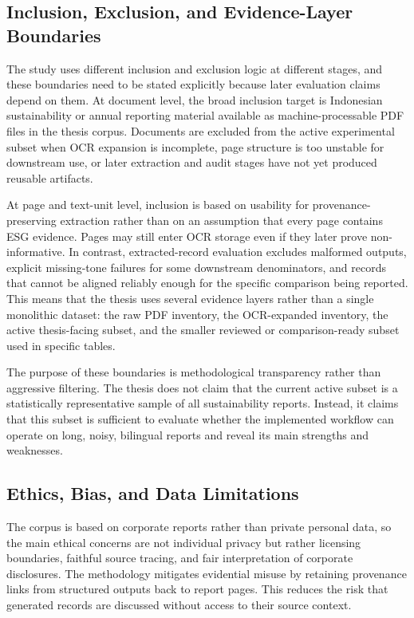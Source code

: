 \subsection{Inclusion, Exclusion, and Evidence-Layer Boundaries}

The study uses different inclusion and exclusion logic at different stages, and these boundaries need to be stated explicitly because later evaluation claims depend on them. At document level, the broad inclusion target is Indonesian sustainability or annual reporting material available as machine-processable PDF files in the thesis corpus. Documents are excluded from the active experimental subset when OCR expansion is incomplete, page structure is too unstable for downstream use, or later extraction and audit stages have not yet produced reusable artifacts.

At page and text-unit level, inclusion is based on usability for provenance-preserving extraction rather than on an assumption that every page contains ESG evidence. Pages may still enter OCR storage even if they later prove non-informative. In contrast, extracted-record evaluation excludes malformed outputs, explicit missing-tone failures for some downstream denominators, and records that cannot be aligned reliably enough for the specific comparison being reported. This means that the thesis uses several evidence layers rather than a single monolithic dataset: the raw PDF inventory, the OCR-expanded inventory, the active thesis-facing subset, and the smaller reviewed or comparison-ready subset used in specific tables.

The purpose of these boundaries is methodological transparency rather than aggressive filtering. The thesis does not claim that the current active subset is a statistically representative sample of all sustainability reports. Instead, it claims that this subset is sufficient to evaluate whether the implemented workflow can operate on long, noisy, bilingual reports and reveal its main strengths and weaknesses.

\subsection{Ethics, Bias, and Data Limitations}

The corpus is based on corporate reports rather than private personal data, so the main ethical concerns are not individual privacy but rather licensing boundaries, faithful source tracing, and fair interpretation of corporate disclosures. The methodology mitigates evidential misuse by retaining provenance links from structured outputs back to report pages. This reduces the risk that generated records are discussed without access to their source context.

